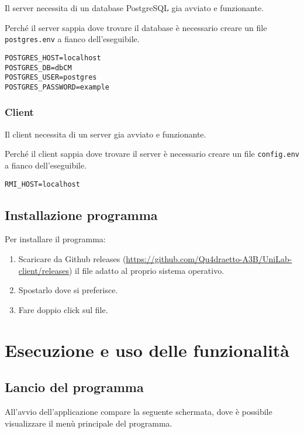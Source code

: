 Il server necessita di un database PostgreSQL gia avviato e funzionante.

Perché il server sappia dove trovare il database è necessario creare un file \texttt{postgres.env} a fianco dell'eseguibile.

\begin{lstlisting}[caption={Esempio \texttt{postgres.env}}]
POSTGRES_HOST=localhost
POSTGRES_DB=dbCM
POSTGRES_USER=postgres
POSTGRES_PASSWORD=example
\end{lstlisting}

\subsection{Client}

Il client necessita di un server gia avviato e funzionante.

Perché il client sappia dove trovare il server è necessario creare un file \texttt{config.env} a fianco dell'eseguibile.

\begin{lstlisting}[caption={Esempio \texttt{postgres.env}}]
RMI_HOST=localhost
\end{lstlisting}

\section{Installazione programma}

Per installare il programma:

\begin{enumerate}
	\item Scaricare da Github releases (\url{https://github.com/Qu4draetto-A3B/UniLab-client/releases}) il file adatto al proprio sistema operativo.
	\item Spostarlo dove si preferisce.
	\item Fare doppio click sul file.
\end{enumerate}

\chapter{Esecuzione e uso delle funzionalità}
\section{Lancio del programma}
All’avvio dell’applicazione compare la seguente schermata, dove è possibile visualizzare il menù principale del programma.
